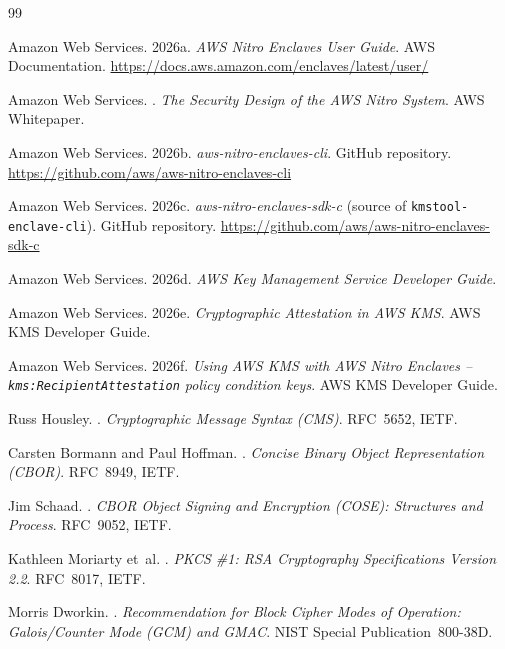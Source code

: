 \documentclass[11pt]{article}
\begin{document}
\begin{thebibliography}{99}

Amazon Web Services.
\newblock 2026a.
\newblock \emph{AWS Nitro Enclaves User Guide}.
\newblock AWS Documentation.
\newblock \url{https://docs.aws.amazon.com/enclaves/latest/user/}

Amazon Web Services.
.
\newblock \emph{The Security Design of the AWS Nitro System}.
\newblock AWS Whitepaper.

Amazon Web Services.
\newblock 2026b.
\newblock \emph{aws-nitro-enclaves-cli}.
\newblock GitHub repository.
\newblock \url{https://github.com/aws/aws-nitro-enclaves-cli}

Amazon Web Services.
\newblock 2026c.
\newblock \emph{aws-nitro-enclaves-sdk-c} (source of
\texttt{kmstool-enclave-cli}).
\newblock GitHub repository.
\newblock \url{https://github.com/aws/aws-nitro-enclaves-sdk-c}

Amazon Web Services.
\newblock 2026d.
\newblock \emph{AWS Key Management Service Developer Guide}.

Amazon Web Services.
\newblock 2026e.
\newblock \emph{Cryptographic Attestation in AWS KMS}.
\newblock AWS KMS Developer Guide.

Amazon Web Services.
\newblock 2026f.
\newblock \emph{Using AWS KMS with AWS Nitro Enclaves --
\texttt{kms:RecipientAttestation} policy condition keys}.
\newblock AWS KMS Developer Guide.

Russ Housley.
.
\newblock \emph{Cryptographic Message Syntax (CMS)}.
\newblock RFC~5652, IETF.

Carsten Bormann and Paul Hoffman.
.
\newblock \emph{Concise Binary Object Representation (CBOR)}.
\newblock RFC~8949, IETF.

Jim Schaad.
.
\newblock \emph{CBOR Object Signing and Encryption (COSE):
Structures and Process}.
\newblock RFC~9052, IETF.

Kathleen Moriarty et~al.
.
\newblock \emph{PKCS \#1: RSA Cryptography Specifications Version 2.2}.
\newblock RFC~8017, IETF.

Morris Dworkin.
.
\newblock \emph{Recommendation for Block Cipher Modes of Operation:
Galois/Counter Mode (GCM) and GMAC}.
\newblock NIST Special Publication~800-38D.


\end{thebibliography}
\end{document}
